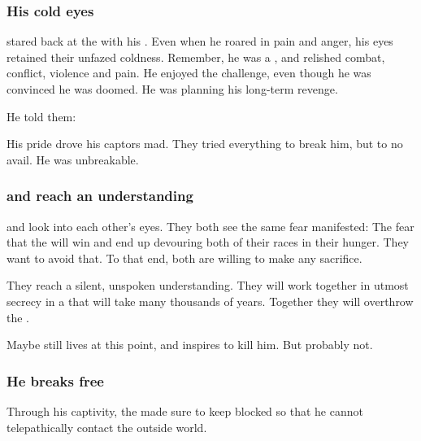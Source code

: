 \subsubsection{His cold eyes}
\Nexagglachel stared back at the \resphain with his . 
Even when he roared in pain and anger, his eyes retained their unfazed coldness. 
Remember, he was a \dragon, and \dragons relished combat, conflict, violence and pain. 
He enjoyed the challenge, even though he was convinced he was doomed. 
He was planning his long-term revenge. 

He told them: 

His pride drove his captors mad. 
They tried everything to break him, but to no avail. 
He was unbreakable. 





\subsubsection{\Nexagglachel and \Azraid reach an understanding}
\Nexagglachel{} and \Azraid{} look into each other's eyes. 
They both see the same fear manifested: 
The fear that the \banes{} will win and end up devouring both of their races in their hunger. 
They want to avoid that. 
To that end, both are willing to make any sacrifice. 

They reach a silent, unspoken understanding. 
They will work together in utmost secrecy in a \XanatosGambit{} that will take many thousands of years. 
Together they will overthrow the \banes. 

Maybe \Damiarch{} still lives at this point, and \Nexagglachel{} inspires \Azraid{} to kill him. 
But probably not. 





\subsubsection{He breaks free}
Through his captivity, the \resphain{} made sure to keep \Nexagglachel{} blocked so that he cannot telepathically contact the outside world. 

